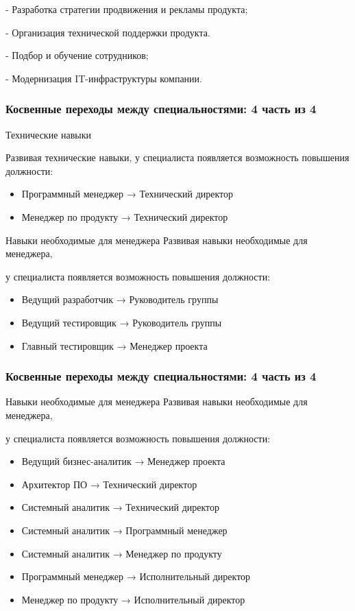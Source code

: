 \documentclass{../industrial-development}
\begin{document}
- Разработка стратегии продвижения и рекламы продукта;

- Организация технической поддержки продукта.

- Подбор и обучение сотрудников;

- Модернизация IT-инфраструктуры компании.

\begin{frame} \frametitle{Косвенные переходы между специальностями: 4 часть из 4}
 \begin{block}{Технические навыки}
 
 Развивая \alert{технические навыки}, у специалиста появляется возможность повышения должности: 
\begin{itemize}
  \item Программный менеджер → Технический директор
  \item Менеджер по продукту → Технический директор
  \end{itemize}
  \end{block}
\begin{block}{Навыки необходимые для менеджера}
 Развивая \alert{навыки необходимые для менеджера}, 

у специалиста появляется возможность повышения должности: 
\begin{itemize}
  \item Ведущий разработчик → Руководитель группы
  \item Ведущий тестировщик → Руководитель группы
\item Главный тестировщик → Менеджер проекта
  \end{itemize}
  \end{block}
\end{frame}

\begin{frame} \frametitle{Косвенные переходы между специальностями: 4 часть из 4}
 \begin{block}{Навыки необходимые для менеджера}
Развивая \alert{навыки необходимые для менеджера}, 

у специалиста появляется возможность повышения должности: 
\begin{itemize}
 \item Ведущий бизнес-аналитик → Менеджер проекта
  \item Архитектор ПО  → Технический директор
\item  Системный аналитик → Технический директор
 \item Системный аналитик → Программный менеджер
 \item Системный аналитик → Менеджер по продукту
\item  Программный менеджер → Исполнительный директор
\item Менеджер по продукту  → Исполнительный директор
  \end{itemize}
  \end{block}

\end{frame}
\end{document}
